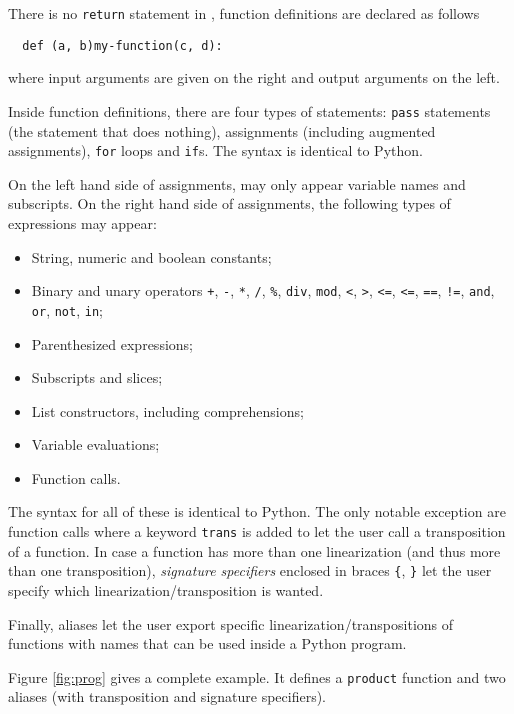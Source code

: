 There is no \lstinline+return+ statement in \tALpy{}, function
definitions are declared as follows
\begin{lstlisting}
  def (a, b)my-function(c, d):
\end{lstlisting}
where input arguments are given on the right and output arguments on
the left.

Inside function definitions, there are four types of statements:
\lstinline+pass+ statements (the statement that does nothing),
assignments (including augmented assignments), \lstinline+for+ loops
and \lstinline+if+s. The syntax is identical to Python.

On the left hand side of assignments, may only appear variable names
and subscripts. On the right hand side of assignments, the following
types of expressions may appear:
\begin{itemize}
\item String, numeric and boolean constants;
\item Binary and unary operators \lstinline-+-, \lstinline+-+,
  \lstinline+*+, \lstinline+/+,
  \lstinline+%+, \lstinline+div+, \lstinline+mod+, \lstinline+<+,
  \lstinline+>+, \lstinline+<=+, \lstinline+<=+, \lstinline+==+,
  \lstinline+!=+, \lstinline+and+, \lstinline+or+, \lstinline+not+,
  \lstinline+in+;
\item Parenthesized expressions;
\item Subscripts and slices;
\item List constructors, including comprehensions;
\item Variable evaluations;
\item Function calls.
\end{itemize}
The syntax for all of these is identical to Python. The only notable
exception are function calls where a keyword \lstinline+trans+ is
added to let the user call a transposition of a function. In case a
function has more than one linearization (and thus more than one
transposition), \emph{signature specifiers} enclosed in braces
\lstinline+{+, \lstinline+}+ let the user specify which
linearization/transposition is wanted.

Finally, aliases let the user export specific
linearization/transpositions of functions with names that can be used
inside a Python program.

Figure \ref{fig:prog} gives a complete \tALpy{} example. It defines a
\lstinline+product+ function and two aliases (with transposition and
signature specifiers).

